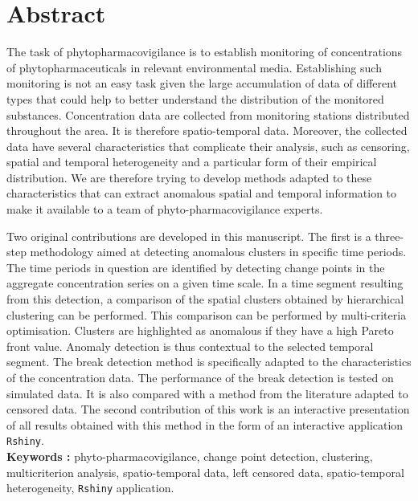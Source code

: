 \section*{Abstract}

The task of phytopharmacovigilance is to establish monitoring of concentrations of phytopharmaceuticals in relevant environmental media. Establishing such monitoring is not an easy task given the large accumulation of data of different types that could help to better understand the distribution of the monitored substances. Concentration data are collected from monitoring stations distributed throughout the area. It is therefore spatio-temporal data. Moreover, the collected data have several characteristics that complicate their analysis, such as censoring, spatial and temporal heterogeneity and a particular form of their empirical distribution. We are therefore trying to develop methods adapted to these characteristics that can extract anomalous spatial and temporal information to make it available to a team of phyto-pharmacovigilance experts.

Two original contributions are developed in this manuscript. The first is a three-step methodology aimed at detecting anomalous clusters in specific time periods. The time periods in question are identified by detecting change points in the aggregate concentration series on a given time scale. In a time segment resulting from this detection, a comparison of the spatial clusters obtained by hierarchical clustering can be performed. This comparison can be performed by multi-criteria optimisation. Clusters are highlighted as anomalous if they have a high Pareto front value. Anomaly detection is thus contextual to the selected temporal segment. The break detection method is specifically adapted to the characteristics of the concentration data. The performance of the break detection is tested on simulated data. It is also compared with a method from the literature adapted to censored data. The second contribution of this work is an interactive presentation of all results obtained with this method in the form of an interactive application \texttt{Rshiny}. \\

\textbf{Keywords :} phyto-pharmacovigilance, change point detection, clustering, multicriterion analysis, spatio-temporal data, left censored data, spatio-temporal heterogeneity, \texttt{Rshiny} application.